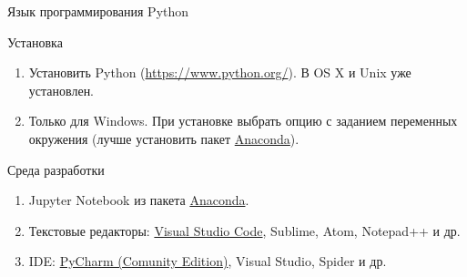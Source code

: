 \documentclass[aspectratio=169, mathserif]{beamer}	%
\begin{document}
\begin{frame}[fragile]{Язык программирования Python}
\begin{alertblock}{Установка}
\begin{enumerate}
	\item Установить Python (\textcolor{linkcolor}{\url{https://www.python.org/}}). В OS X и Unix уже установлен.
	\item Только для Windows. При установке выбрать опцию с заданием переменных окружения (лучше установить пакет \href{https://www.anaconda.com/products/individual}{\textcolor{linkcolor}{Anaconda}}).
\end{enumerate}
\end{alertblock}
\begin{alertblock}{Среда разработки}
\begin{enumerate}
	\item Jupyter Notebook из пакета \href{https://www.anaconda.com/products/individual}{\textcolor{linkcolor}{Anaconda}}.
	\item Текстовые редакторы: \href{https://code.visualstudio.com/}{\textcolor{linkcolor}{Visual Studio Code}}, Sublime, Atom, Notepad++ и др.
	\item IDE: \href{https://www.jetbrains.com/pycharm/download/#section=windows}{\textcolor{linkcolor}{PyCharm (Comunity Edition)}}, Visual Studio, Spider и др.
\end{enumerate}
\end{alertblock}
\vfill
\end{frame}
\end{document}
